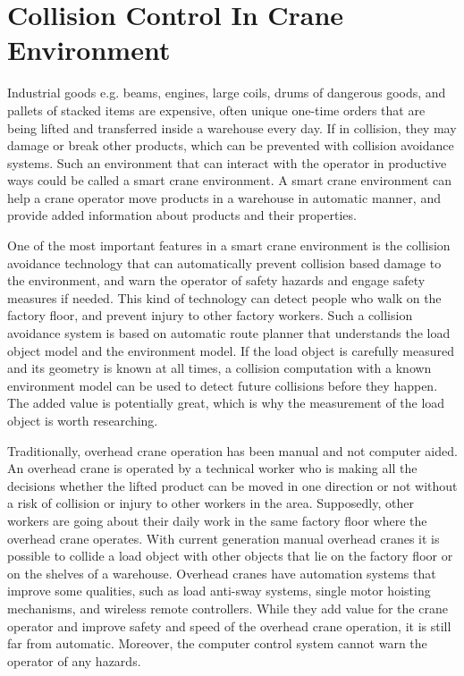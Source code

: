 \documentclass[12pt,a4paper,oneside,pdftex]{report}
\begin{document}
\section{Collision Control In Crane Environment}
\label{section:collision_control_in_crane_environment}

Industrial goods e.g. beams, engines, large coils, drums of dangerous goods, and pallets of stacked items are expensive, often unique one-time orders that are being lifted and transferred inside a warehouse every day. If in collision, they may damage or break other products, which can be prevented with collision avoidance systems. Such an environment that can interact with the operator in productive ways could be called a smart crane environment. A smart crane environment can help a crane operator move products in a warehouse in automatic manner, and provide added information about products and their properties.

One of the most important features in a smart crane environment is the collision avoidance technology that can automatically prevent collision based damage to the environment, and warn the operator of safety hazards and engage safety measures if needed. This kind of technology can detect people who walk on the factory floor, and prevent injury to other factory workers. Such a collision avoidance system is based on automatic route planner that understands the load object model and the environment model. If the load object is carefully measured and its geometry is known at all times, a collision computation with a known environment model can be used to detect future collisions before they happen. The added value is potentially great, which is why the measurement of the load object is worth researching.

Traditionally, overhead crane operation has been manual and not computer aided. An overhead crane is operated by a technical worker who is making all the decisions whether the lifted product can be moved in one direction or not without a risk of collision or injury to other workers in the area. Supposedly, other workers are going about their daily work in the same factory floor where the overhead crane operates. With current generation manual overhead cranes it is possible to collide a load object with other objects that lie on the factory floor or on the shelves of a warehouse. Overhead cranes have automation systems that improve some qualities, such as load anti-sway systems, single motor hoisting mechanisms, and wireless remote controllers. While they add value for the crane operator and improve safety and speed of the overhead crane operation, it is still far from automatic. Moreover, the computer control system cannot warn the operator of any hazards.
\end{document}
